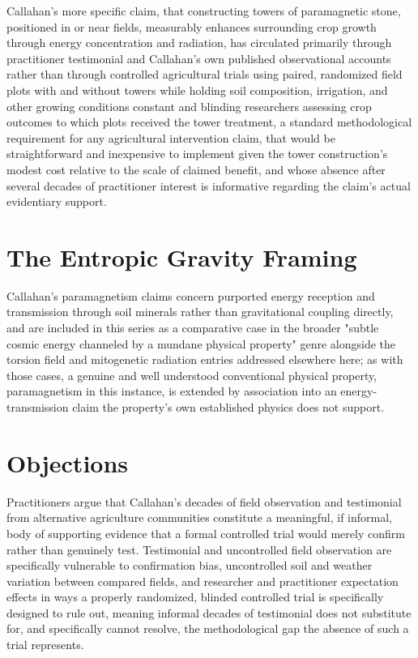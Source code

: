 \documentclass[11pt]{article}
\begin{document}
Callahan's more specific claim, that constructing towers of paramagnetic stone, positioned in or near fields, measurably enhances surrounding crop growth through energy concentration and radiation, has circulated primarily through practitioner testimonial and Callahan's own published observational accounts rather than through controlled agricultural trials using paired, randomized field plots with and without towers while holding soil composition, irrigation, and other growing conditions constant and blinding researchers assessing crop outcomes to which plots received the tower treatment, a standard methodological requirement for any agricultural intervention claim, that would be straightforward and inexpensive to implement given the tower construction's modest cost relative to the scale of claimed benefit, and whose absence after several decades of practitioner interest is informative regarding the claim's actual evidentiary support.

\section{The Entropic Gravity Framing}

Callahan's paramagnetism claims concern purported energy reception and transmission through soil minerals rather than gravitational coupling directly, and are included in this series as a comparative case in the broader "subtle cosmic energy channeled by a mundane physical property" genre alongside the torsion field and mitogenetic radiation entries addressed elsewhere here; as with those cases, a genuine and well understood conventional physical property, paramagnetism in this instance, is extended by association into an energy-transmission claim the property's own established physics does not support.

\section{Objections}

Practitioners argue that Callahan's decades of field observation and testimonial from alternative agriculture communities constitute a meaningful, if informal, body of supporting evidence that a formal controlled trial would merely confirm rather than genuinely test. Testimonial and uncontrolled field observation are specifically vulnerable to confirmation bias, uncontrolled soil and weather variation between compared fields, and researcher and practitioner expectation effects in ways a properly randomized, blinded controlled trial is specifically designed to rule out, meaning informal decades of testimonial does not substitute for, and specifically cannot resolve, the methodological gap the absence of such a trial represents.
\end{document}
